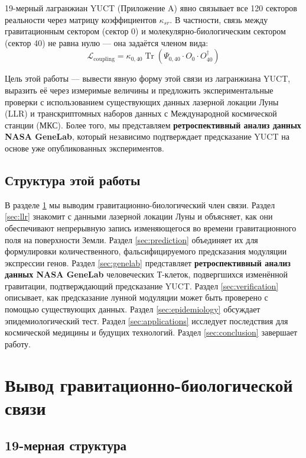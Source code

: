 \documentclass[12pt,a4paper]{article}
\theoremstyle{remark}
\begin{document}
	19-мерный лагранжиан YUCT (Приложение A) явно связывает все 120 секторов реальности через матрицу коэффициентов \(\kappa_{sr}\). В частности, связь между гравитационным сектором (сектор 0) и молекулярно-биологическим сектором (сектор 40) не равна нулю — она задаётся членом вида:
	\begin{equation}
		\mathcal{L}_{\text{coupling}} = \kappa_{0,40} \operatorname{Tr}(\Psi_{0,40} \cdot O_0 \cdot O_{40}^\dagger)
		\label{eq:coupling-general}
	\end{equation}
	
	Цель этой работы — вывести явную форму этой связи из лагранжиана YUCT, выразить её через измеримые величины и предложить экспериментальные проверки с использованием существующих данных лазерной локации Луны (LLR) и транскриптомных наборов данных с Международной космической станции (МКС). Более того, мы представляем \textbf{ретроспективный анализ данных NASA GeneLab}, который независимо подтверждает предсказание YUCT на основе уже опубликованных экспериментов.
	
	\subsection{Структура этой работы}
	
	В разделе \ref{sec:derivation} мы выводим гравитационно-биологический член связи. Раздел \ref{sec:llr} знакомит с данными лазерной локации Луны и объясняет, как они обеспечивают непрерывную запись изменяющегося во времени гравитационного поля на поверхности Земли. Раздел \ref{sec:prediction} объединяет их для формулировки количественного, фальсифицируемого предсказания модуляции экспрессии генов. Раздел \ref{sec:genelab} представляет \textbf{ретроспективный анализ данных NASA GeneLab} человеческих Т-клеток, подвергшихся изменённой гравитации, подтверждающий предсказание YUCT. Раздел \ref{sec:verification} описывает, как предсказание лунной модуляции может быть проверено с помощью существующих данных. Раздел \ref{sec:epidemiology} обсуждает эпидемиологический тест. Раздел \ref{sec:applications} исследует последствия для космической медицины и будущих технологий. Раздел \ref{sec:conclusion} завершает работу.
	
	\section{Вывод гравитационно-биологической связи}
	\label{sec:derivation}
	
	\subsection{19-мерная структура}
	
\end{document}

